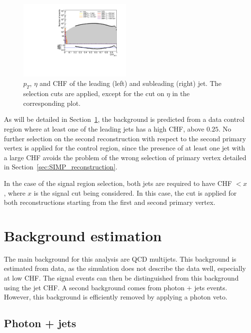 \begin{figure}[ht]
  \includegraphics[width=0.5\textwidth]{figures/jet2_chf_newtrigger}
  \caption{$p_T$, $\eta$ and CHF of the leading (left) and subleading (right) jet. The selection cuts are applied, except for the cut on $\eta$ in the corresponding plot.}
  \label{fig:event_selection}
\end{figure}

As will be detailed in Section~\ref{sec:SIMP_backgrounds}, the background is predicted from a data control region where at least one of the leading jets has a high CHF, above $0.25$. No further selection on the second reconstruction with respect to the second primary vertex is applied for the control region, since the presence of at least one jet with a large CHF avoids the problem of the wrong selection of primary vertex detailed in Section~\ref{sec:SIMP_reconstruction}.

In the case of the signal region selection, both jets are required to have CHF $< x$, where $x$ is the signal cut being considered. In this case, the cut is applied for both reconstructions starting from the first and second primary vertex.

\section{Background estimation}
\label{sec:SIMP_backgrounds}

The main background for this analysis are \acs{QCD} multijets. This background is estimated from data, as the simulation does not describe the data well, especially at low CHF. The signal events can then be distinguished from this background using the jet CHF. A second background comes from photon + jets events. However, this background is efficiently removed by applying a photon veto.

\subsection{Photon + jets}

